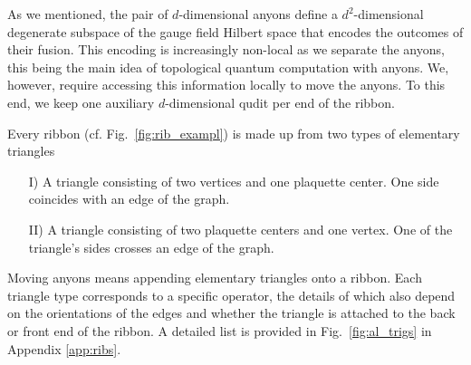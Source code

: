 \documentclass[two column]{article}
\begin{document}
As we mentioned, the pair of $d$-dimensional anyons define a $d^2$-dimensional degenerate subspace of the gauge field Hilbert space that encodes the outcomes of their fusion. This encoding is increasingly non-local as we separate the anyons, this being the main idea of topological quantum computation with anyons. We, however, require accessing this information locally to move the anyons. To this end, we keep one auxiliary $d$-dimensional qudit per end of the ribbon.

Every ribbon (cf. Fig.~\ref{fig:rib_exampl}) is made up from two types of elementary triangles
\begin{itemize}
    \item[I)] A triangle consisting of two vertices and one plaquette center. One side coincides with an edge of the graph.
        \item[II)] A triangle consisting of two plaquette centers and one vertex. One of the triangle's sides crosses an edge of the graph.
\end{itemize}
Moving anyons means appending elementary triangles onto a ribbon. Each triangle type corresponds to a specific operator, the details of which also depend on the orientations of the edges and whether the triangle is attached to the back or front end of the ribbon. A detailed list is provided in Fig.~\ref{fig:al_trigs} in Appendix \ref{app:ribs}.
\end{document}
